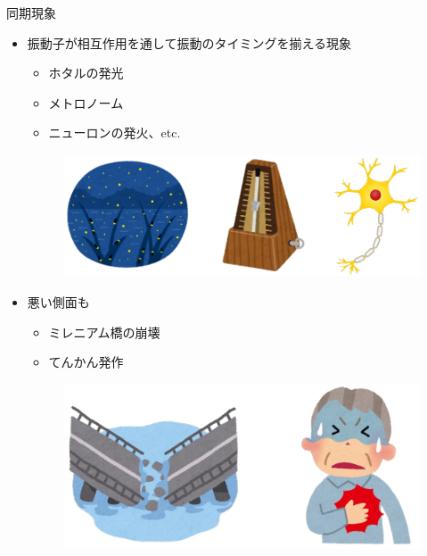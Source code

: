 \begin{frame}{同期現象}
  \begin{itemize}
    \item 振動子が相互作用を通して振動のタイミングを揃える現象
    \begin{itemize}
      \item ホタルの発光
      \item メトロノーム
      \item ニューロンの発火、etc.
    \end{itemize}
  \begin{figure}
    \includegraphics[height=0.2\textheight]{figs/sync_image.pdf}
  \end{figure}
  \item 悪い側面も
  \begin{itemize}
    \item ミレニアム橋の崩壊
    \item てんかん発作
  \end{itemize}
  \begin{figure}
    \includegraphics[height=0.2\textheight]{figs/sync_bad.pdf}
  \end{figure}
  \end{itemize}
\end{frame}

